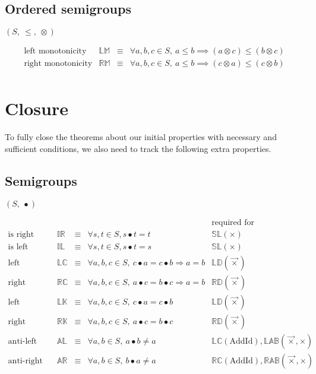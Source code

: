 \documentclass[10pt]{article}
\newcommand{\propname}[1]{{\mathbb{#1}}}
\begin{document}
\subsection{Ordered semigroups}

$(S,\ \leq,\ \otimes)$

\[ 
\begin{array}{c|ccl} 
\mbox{left monotonicity} 
   & \propname{LM} 
   & \equiv 
   & \forall a, b, c \in S,\ a\leq b \implies (a\otimes c) \leq (b\otimes c) 
   \\ 
\mbox{right monotonicity} 
   & \propname{RM} 
   & \equiv 
   & \forall a, b, c \in S,\ a\leq b \implies (c\otimes a) \leq (c\otimes b)
   \\ 
\end{array} 
\] 


\section{Closure} 

To fully close the theorems about our initial properties with necessary and sufficient conditions, we also need to track the following extra properties. 

\subsection{Semigroups}
$(S,\ \bullet)$

\[ 
\begin{array}{c|ccl|l} 
   & 
   & 
   & 
   & \mbox{required for} 
   \\ \hline 
\mbox{is right}   
   & \propname{IR} 
   & \equiv 
   & \forall s, t\in S, s \bullet t = t 
   & \propname{SL}(\times)
   \\ 
\mbox{is left}   
   & \propname{IL} 
   & \equiv 
   & \forall s, t\in S, s \bullet t = s 
   & \propname{SL}(\times)
   \\ 
\mbox{left cancellative}   
   & \propname{LC}
   & \equiv 
   & \forall a, b, c\in S,\  c \bullet a = c \bullet b \Rightarrow a = b 
   & \propname{LD}(\vec{\times})
   \\ 
\mbox{right cancellative}   
    & \propname{RC}
    & \equiv 
    & \forall a, b, c\in S,\  a \bullet c = b \bullet c \Rightarrow a = b
   & \propname{RD}(\vec{\times})
   \\ 
\mbox{left constant}   
   & \propname{LK}
   & \equiv 
   & \forall a, b, c\in S,\ c \bullet a = c \bullet b 
   & \propname{LD}(\vec{\times})
   \\ 
\mbox{right constant}   
   & \propname{RK}
   & \equiv 
   & \forall a, b, c\in S,\ a \bullet c =  b \bullet c
   & \propname{RD}(\vec{\times})
   \\ 
\mbox{anti-left}   
   & \propname{AL}
   & \equiv 
   & \forall a, b\in S,\ a \bullet b \not= a
   & \propname{LC}(\mathrm{AddId}),  
     \propname{LAB}(\vec{\times}, \times)   
   \\ 
\mbox{anti-right}   
   & \propname{AR}
   & \equiv 
   & \forall a, b\in S,\ b \bullet a \not= a
   & \propname{RC}(\mathrm{AddId}), 
     \propname{RAB}(\vec{\times}, \times)   
   \\ 
\end{array} 
\]
\end{document}
